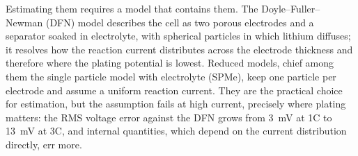 \documentclass[journal]{IEEEtran}
\begin{document}
Estimating them requires a model that contains them. The Doyle--Fuller--Newman (DFN) model\cite{doyle1993,ramadesigan2012,brosaplanella2022} describes the cell as two porous electrodes and a separator soaked in electrolyte, with spherical particles in which lithium diffuses; it resolves how the reaction current distributes across the electrode thickness and therefore where the plating potential is lowest. Reduced models, chief among them the single particle model with electrolyte (SPMe)\cite{marquis2019}, keep one particle per electrode and assume a uniform reaction current. They are the practical choice for estimation\cite{moura2017}, but the assumption fails at high current, precisely where plating matters: the RMS voltage error against the DFN grows from \SI{3}{\milli\volt} at 1C to \SI{13}{\milli\volt} at 3C\cite{marquis2019}, and internal quantities, which depend on the current distribution directly, err more.
\end{document}
